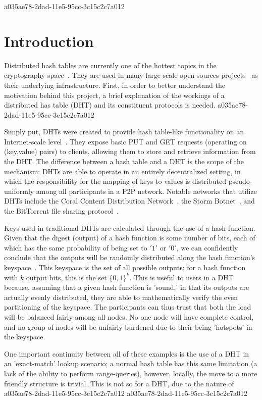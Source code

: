 \documentclass[12pt]{article}
\begin{document}
a035ae78-2dad-11e5-95cc-3c15c2c7a012\section{Introduction}
\par Distributed hash tables are currently one of the hottest topics in the cryptography space~\cite{Stoica:2001dj,Rowstron:2001ea,Ratnasamy:2001wn}. They are used in many large scale open sources projects~\cite{Freitas:2013tb,Xu:2010vs,Perfitt:2010fh} as their underlying infrastructure. First, in order to better understand the motivation behind this project, a brief explanation of the workings of a distributed has table (DHT) and its constituent protocols is needed.
a035ae78-2dad-11e5-95cc-3c15c2c7a012
\par Simply put, DHTs were created to provide hash table-like functionality on an Internet-scale level~\cite{Ratnasamy:2001wn}. They expose basic PUT and GET requests (operating on (key,value) pairs) to clients, allowing them to store and retrieve information from the DHT. The difference between a hash table and a DHT is the scope of the mechanism: DHTs are able to operate in an entirely decentralized setting, in which the responsibility for the mapping of keys to values is distributed pseudo-uniformly among all participants in a P2P network. Notable networks that utilize DHTs include the Coral Content Distribution Network~\cite{Freedman:2004vb}, the Storm Botnet~\cite{Holz:2008uk}, and the BitTorrent file sharing protocol~\cite{Cohen:y1_8mBnw}.

\par Keys used in traditional DHTs are calculated through the use of a hash function. Given that the digest (output) of a hash function is some number of bits, each of which has the same probability of being set to $'1'$ or $'0'$, we can confidently conclude that the outputs will be randomly distributed along the hash function's keyspace~. This keyspace is the set of all possible outputs; for a hash function with $k$ output bits, this is the set $\{0,1\}^k$. This is useful to users in a DHT because, assuming that a given hash function is 'sound,' in that its outputs are actually evenly distributed, they are able to mathematically verify the even partitioning of the keyspace. The participants can thus trust that both the load will be balanced fairly among all nodes. No one node will have complete control, and no group of nodes will be unfairly burdened due to their being 'hotspots' in the keyspace.~

\par One important continuity between all of these examples is the use of a DHT in an 'exact-match' lookup scenario; a normal hash table has this same limitation (a lack of the ability to perform range-queries), however, locally, the move to a more friendly structure is trivial. This is not so for a DHT, due to the nature of
a035ae78-2dad-11e5-95cc-3c15c2c7a012\printbibliography
a035ae78-2dad-11e5-95cc-3c15c2c7a012
\end{document}
